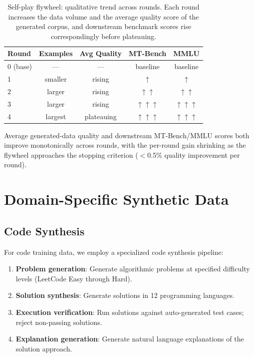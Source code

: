 \documentclass[11pt,a4paper]{article}
\begin{document}
\begin{table}[H]
\centering
\caption{Self-play flywheel: qualitative trend across rounds. Each round increases the
data volume and the average quality score of the generated corpus, and downstream
benchmark scores rise correspondingly before plateauing.}
\label{tab:flywheel}
\begin{tabular}{lcccc}
\toprule
Round & Examples & Avg Quality & MT-Bench & MMLU \\
\midrule
0 (base) & ---      & ---          & baseline   & baseline \\
1        & smaller  & rising       & $\uparrow$ & $\uparrow$ \\
2        & larger   & rising       & $\uparrow\uparrow$ & $\uparrow\uparrow$ \\
3        & larger   & rising       & $\uparrow\uparrow\uparrow$ & $\uparrow\uparrow\uparrow$ \\
4        & largest  & plateauing   & $\uparrow\uparrow\uparrow$ & $\uparrow\uparrow\uparrow$ \\
\bottomrule
\end{tabular}
\end{table}

Average generated-data quality and downstream MT-Bench/MMLU scores both improve
monotonically across rounds, with the per-round gain shrinking as the flywheel
approaches the stopping criterion ($<$0.5\% quality improvement per round).

\section{Domain-Specific Synthetic Data}

\subsection{Code Synthesis}

For code training data, we employ a specialized code synthesis pipeline:

\begin{enumerate}
  \item \textbf{Problem generation}: Generate algorithmic problems at specified difficulty levels (LeetCode Easy through Hard).
  \item \textbf{Solution synthesis}: Generate solutions in 12 programming languages.
  \item \textbf{Execution verification}: Run solutions against auto-generated test cases; reject non-passing solutions.
  \item \textbf{Explanation generation}: Generate natural language explanations of the solution approach.
\end{enumerate}
\end{document}
